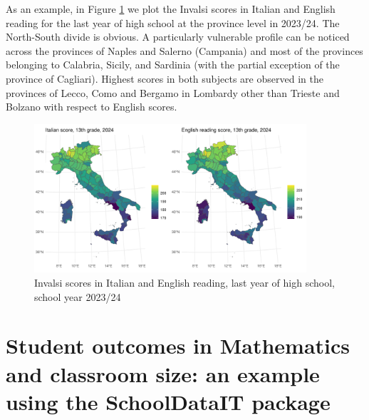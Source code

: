 \documentclass{article}%
\begin{document}
As an example, in Figure \ref{fig:Invalsi} we plot the Invalsi scores in Italian and English reading for the last year of high school at the province level in 2023/24. The North-South divide is obvious. A particularly vulnerable profile can be noticed across the provinces of Naples and Salerno (Campania) and most of the provinces belonging to Calabria, Sicily, and Sardinia (with the partial exception of the province of Cagliari). Highest scores in both subjects are observed in the provinces of Lecco, Como and Bergamo in Lombardy other than Trieste and Bolzano with respect to English scores.

\begin{figure}
  \centering
  \includegraphics[width = 0.9\textwidth]{Fig6.pdf} 
  \caption{Invalsi scores in Italian and English reading, last year of high school, school year 2023/24}
  \label{fig:Invalsi}
\end{figure}





\section{Student outcomes in Mathematics and classroom size: an example using the SchoolDataIT package} \label{sec:Example}
\end{document}
